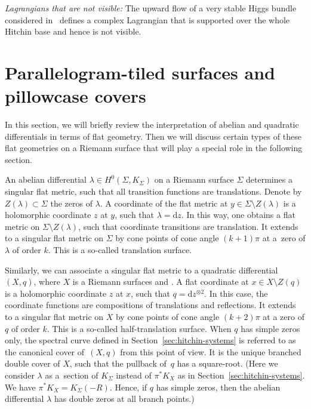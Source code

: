 \documentclass[10pt,a4paper]{amsart}
\numberwithin{equation}{section}
\theoremstyle{definition}
\renewcommand{\d}{\mathrm{d}}
\begin{document}
\textit{Lagrangians that are not visible:} The upward flow of a very stable Higgs bundle considered in~\cite{HauselHitchin, PaulyPeon} defines a complex Lagrangian that is supported over the whole Hitchin base and hence is not visible.

\section{Parallelogram-tiled surfaces and pillowcase covers}\label{sec:rhomb-tiled-surf}

In this section, we will briefly review the interpretation of abelian and quadratic differentials in terms of flat geometry. Then we will discuss certain types of these flat geometries on a Riemann surface that will play a special role in the following section.

An abelian differential $\lambda \in H^0(\Sigma,K_\Sigma)$ on a Riemann surface $\Sigma$ determines a singular flat metric, such that all transition functions are translations. Denote by $Z(\lambda) \subset \Sigma$ the zeros of $\lambda$. A coordinate of the flat metric at $y \in \Sigma \setminus Z(\lambda)$ is a holomorphic coordinate $z$ at $y$, such that $\lambda= \d z$. In this way, one obtains a flat metric on $\Sigma\setminus Z(\lambda)$, such that coordinate transitions are translation. It extends to a singular flat metric on $\Sigma$ by cone points of cone angle $(k+1)\pi$ at a~zero of $\lambda$ of order $k$. This is a so-called translation surface.

Similarly, we can associate a singular flat metric to a quadratic differential $(X,q)$, where $X$ is a Riemann surfaces and . A flat coordinate at $x \in X\setminus Z(q)$ is a holomorphic coordinate $z$ at $x$, such that $q= \d z ^{\otimes 2}$. In this case, the coordinate functions are compositions of translations and reflections. It extends to a singular flat metric on $X$ by cone points of cone angle $(k+2)\pi$ at a zero of $q$ of order $k$. This is a so-called half-translation surface. When $q$ has simple zeros only, the spectral curve defined in Section~\ref{sec:hitchin-systems} is referred to as the canonical cover of~$(X,q)$ from this point of view. It is the unique branched double cover of $X$, such that the pullback of~$q$ has a square-root. (Here we consider $\lambda$ as a~section of $K_\Sigma$ instead of $\pi^*K_X$ as in Section~\ref{sec:hitchin-systems}. We have $\pi^*K_X=K_\Sigma(-R)$. Hence, if $q$ has simple zeros, then the abelian differential $\lambda$ has double zeros at all branch points.)
\end{document}
